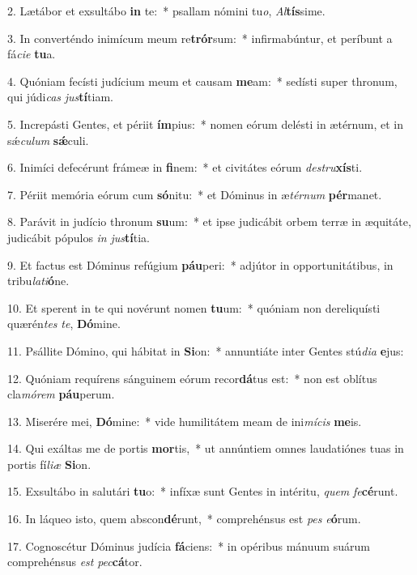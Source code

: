 2. Lætábor et exsultábo \textbf{in} te:~*  psallam nómini tu\textit{o}, \textit{Al}\textbf{tís}sime.\

3. In converténdo inimícum meum re\textbf{trór}sum:~*  infirmabúntur, et períbunt a fá\textit{ci}\textit{e} \textbf{tu}a.\

4. Quóniam fecísti judícium meum et causam \textbf{me}am:~*  sedísti super thronum, qui júdi\textit{cas} \textit{jus}\textbf{tí}tiam.\

5. Increpásti Gentes, et périit \textbf{ím}pius:~*  nomen eórum delésti in ætérnum, et in sǽ\textit{cu}\textit{lum} \textbf{sǽ}culi.\

6. Inimíci defecérunt frámeæ in \textbf{fi}nem:~*  et civitátes eórum \textit{de}\textit{stru}\textbf{xís}ti.\

7. Périit memória eórum cum \textbf{só}nitu:~*  et Dóminus in æ\textit{tér}\textit{num} \textbf{pér}manet.\

8. Parávit in judício thronum \textbf{su}um:~*  et ipse judicábit orbem terræ in æquitáte, judicábit pópulos \textit{in} \textit{jus}\textbf{tí}tia.\

9. Et factus est Dóminus refúgium \textbf{páu}peri:~*  adjútor in opportunitátibus, in tribu\textit{la}\textit{ti}\textbf{ó}ne.\

10. Et sperent in te qui novérunt nomen \textbf{tu}um:~*  quóniam non dereliquísti quærén\textit{tes} \textit{te}, \textbf{Dó}mine.\

11. Psállite Dómino, qui hábitat in \textbf{Si}on:~*  annuntiáte inter Gentes stú\textit{di}\textit{a} \textbf{e}jus:\

12. Quóniam requírens sánguinem eórum recor\textbf{dá}tus est:~*  non est oblítus cla\textit{mó}\textit{rem} \textbf{páu}perum.\

13. Miserére mei, \textbf{Dó}mine:~*  vide humilitátem meam de ini\textit{mí}\textit{cis} \textbf{me}is.\

14. Qui exáltas me de portis \textbf{mor}tis,~*  ut annúntiem omnes laudatiónes tuas in portis fí\textit{li}\textit{æ} \textbf{Si}on.\

15. Exsultábo in salutári \textbf{tu}o:~*  infíxæ sunt Gentes in intéritu, \textit{quem} \textit{fe}\textbf{cé}runt.\

16. In láqueo isto, quem abscon\textbf{dé}runt,~*  comprehénsus est \textit{pes} \textit{e}\textbf{ó}rum.\

17. Cognoscétur Dóminus judícia \textbf{fá}ciens:~*  in opéribus mánuum suárum comprehénsus \textit{est} \textit{pec}\textbf{cá}tor.\

